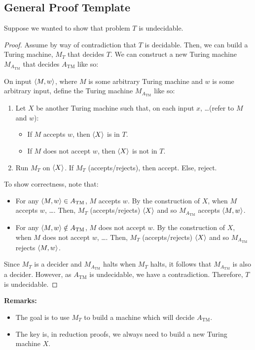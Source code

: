 \documentclass[letterpaper]{article}
\begin{document}
\subsection{General Proof Template}
Suppose we wanted to show that problem $T$ is undecidable. 
\begin{mdframed}[]
    \begin{proof}
        Assume by way of contradiction that $T$ is decidable. Then, we can build a Turing machine, $M_T$ that decides $T$. We can construct a new Turing machine $M_{A_{\text{TM}}}$ that decides $A_{\text{TM}}$ like so:
        \begin{mdframed}[]
            On input $\langle M, w \rangle$, where $M$ is some arbitrary Turing machine and $w$ is some arbitrary input, define the Turing machine $M_{A_{\text{TM}}}$ like so: 
            \begin{enumerate}
                \item Let $X$ be another Turing machine such that, on each input $x$, \dots (refer to $M$ and $w$):
                \begin{itemize}
                    \item If $M$ accepts $w$, then $\langle X \rangle$ is in $T$. 
                    \item If $M$ does not accept $w$, then $\langle X \rangle$ is not in $T$. 
                \end{itemize}
                \item Run $M_T$ on $\langle X \rangle$. If $M_T$ (accepts/rejects), then accept. Else, reject.
            \end{enumerate}
        \end{mdframed}
        To show correctness, note that: 
        \begin{itemize}
            \item For any $\langle M, w \rangle \in A_{\text{TM}}$, $M$ accepts $w$. By the construction of $X$, when $M$ accepts $w$, \dots. Then, $M_T$ (accepts/rejects) $\langle X \rangle$ and so $M_{A_{\text{TM}}}$ accepts $\langle M, w \rangle$. 
            \item For any $\langle M, w \rangle \notin A_{\text{TM}}$, $M$ does not accept $w$. By the construction of $X$, when $M$ does not accept $w$, \dots. Then, $M_T$ (accepts/rejects) $\langle X \rangle$ and so $M_{A_{\text{TM}}}$ rejects $\langle M, w \rangle$. 
        \end{itemize}
        Since $M_T$ is a decider and $M_{A_{\text{TM}}}$ halts when $M_T$ halts, it follows that $M_{A_{\text{TM}}}$ is also a decider. However, as $A_{\text{TM}}$ is undecidable, we have a contradiction. Therefore, $T$ is undecidable. 
    \end{proof}
\end{mdframed}
\textbf{Remarks:}
\begin{itemize}
    \item The goal is to use $M_T$ to build a machine which will decide $A_{\text{TM}}$.
    \item The key is, in reduction proofs, we always need to build a new Turing machine $X$. 
\end{itemize}
\end{document}
